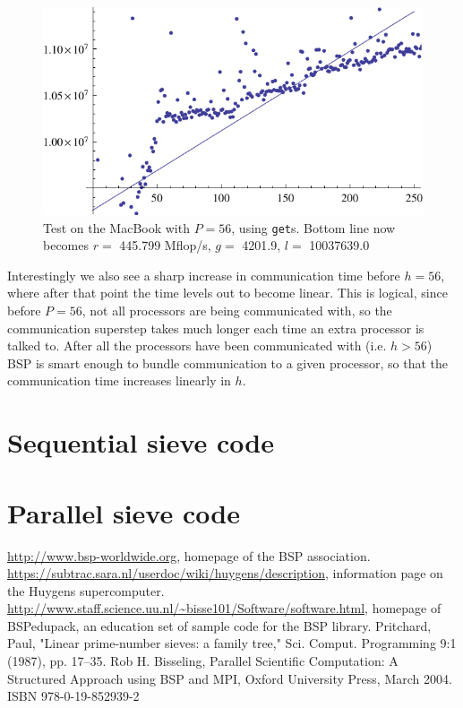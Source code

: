 \documentclass[a4paper]{article}
\begin{document}
\begin{figure}[h]
    \begin{center}
        \includegraphics{img/bench-laptop-get-p56.pdf}
    \end{center}
    \caption{Test on the MacBook with $P=56$, using \texttt{get}s. Bottom line
    now becomes $r=$ 445.799 Mflop/s, $g=$ 4201.9, $l=$ 10037639.0}
    \label{fig:bench-laptop-get-p56}
\end{figure}

Interestingly we also see a sharp increase in communication time before $h=56$,
where after that point the time levels out to become linear. This is logical,
since before $P=56$, not all processors are being communicated with, so the
communication superstep takes much longer each time an extra processor is talked
to. After all the processors have been communicated with (i.e. $h>56$) BSP is
smart enough to bundle communication to a given processor, so that the
communication time increases linearly in $h$. 



\appendix
\section{Sequential sieve code}\label{app:seq}


\section{Parallel sieve code}\label{app:par}



\begin{thebibliography}{99}
     \url{http://www.bsp-worldwide.org}, homepage of the BSP
        association. 
        \url{https://subtrac.sara.nl/userdoc/wiki/huygens/description},
        information page on the Huygens supercomputer. 
        \url{http://www.staff.science.uu.nl/~bisse101/Software/software.html}, homepage of BSPedupack, an education set of sample code for the
        BSP library. 
     Pritchard, Paul, "Linear prime-number sieves: a family tree," Sci. Comput. Programming 9:1 (1987), pp. 17–35.
     Rob H. Bisseling, Parallel Scientific Computation: A Structured Approach using BSP and MPI, Oxford University Press, March 2004. ISBN 978-0-19-852939-2
\end{thebibliography}
\end{document}
